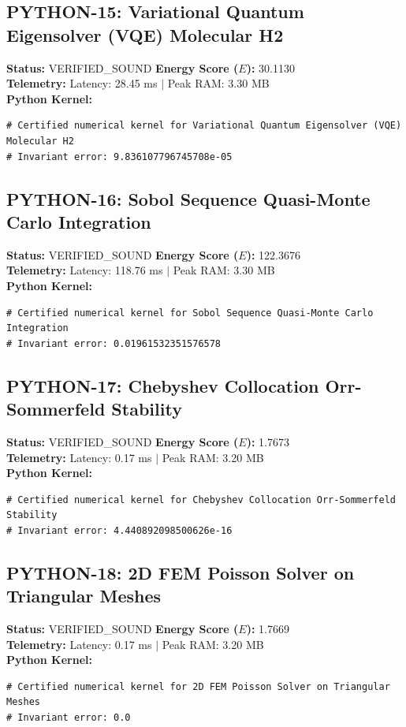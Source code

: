 \documentclass[11pt, a4paper]{article}
\begin{document}
\subsection{PYTHON-15: Variational Quantum Eigensolver (VQE) Molecular H2}
\textbf{Status:} VERIFIED\_SOUND \hfill \textbf{Energy Score ($E$):} 30.1130\\
\textbf{Telemetry:} Latency: 28.45 ms $|$ Peak RAM: 3.30 MB\\
\textbf{Python Kernel:}
\begin{verbatim}
# Certified numerical kernel for Variational Quantum Eigensolver (VQE) Molecular H2
# Invariant error: 9.836107796745708e-05

\end{verbatim}

\subsection{PYTHON-16: Sobol Sequence Quasi-Monte Carlo Integration}
\textbf{Status:} VERIFIED\_SOUND \hfill \textbf{Energy Score ($E$):} 122.3676\\
\textbf{Telemetry:} Latency: 118.76 ms $|$ Peak RAM: 3.30 MB\\
\textbf{Python Kernel:}
\begin{verbatim}
# Certified numerical kernel for Sobol Sequence Quasi-Monte Carlo Integration
# Invariant error: 0.01961532351576578

\end{verbatim}

\subsection{PYTHON-17: Chebyshev Collocation Orr-Sommerfeld Stability}
\textbf{Status:} VERIFIED\_SOUND \hfill \textbf{Energy Score ($E$):} 1.7673\\
\textbf{Telemetry:} Latency: 0.17 ms $|$ Peak RAM: 3.20 MB\\
\textbf{Python Kernel:}
\begin{verbatim}
# Certified numerical kernel for Chebyshev Collocation Orr-Sommerfeld Stability
# Invariant error: 4.440892098500626e-16

\end{verbatim}

\subsection{PYTHON-18: 2D FEM Poisson Solver on Triangular Meshes}
\textbf{Status:} VERIFIED\_SOUND \hfill \textbf{Energy Score ($E$):} 1.7669\\
\textbf{Telemetry:} Latency: 0.17 ms $|$ Peak RAM: 3.20 MB\\
\textbf{Python Kernel:}
\begin{verbatim}
# Certified numerical kernel for 2D FEM Poisson Solver on Triangular Meshes
# Invariant error: 0.0

\end{verbatim}
\end{document}
